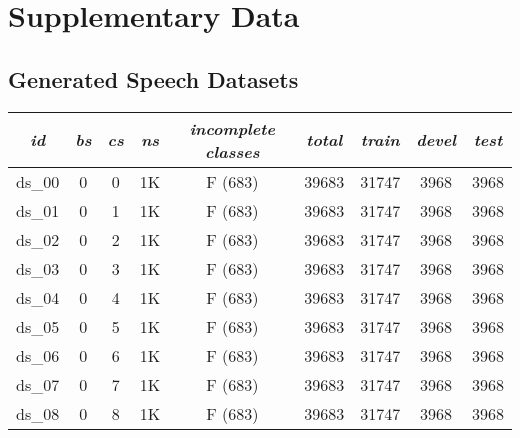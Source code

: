 \chapter{Supplementary Data} \label{app:supplementary_data}

\section*{Generated Speech Datasets} \label{app:sec:generated_speech_datasets}

\begin{footnotesize}
\begin{longtable}{|c|c|c|c|c|c|c|c|c|}
\hline
\textit{id} & \textit{bs} & \textit{cs} & \textit{ns} & \textit{incomplete classes} & \textit{total} & \textit{train} & \textit{devel} & \textit{test} \\ \hline
\endhead
ds\_00      & 0           & 0           & 1K        & F (683)                     & 39683         & 31747          & 3968           & 3968          \\ \hline
ds\_01      & 0           & 1           & 1K        & F (683)                     & 39683         & 31747          & 3968           & 3968          \\ \hline
ds\_02      & 0           & 2           & 1K        & F (683)                     & 39683         & 31747          & 3968           & 3968          \\ \hline
ds\_03      & 0           & 3           & 1K        & F (683)                     & 39683         & 31747          & 3968           & 3968          \\ \hline
ds\_04      & 0           & 4           & 1K        & F (683)                     & 39683         & 31747          & 3968           & 3968          \\ \hline
ds\_05      & 0           & 5           & 1K        & F (683)                     & 39683         & 31747          & 3968           & 3968          \\ \hline
ds\_06      & 0           & 6           & 1K        & F (683)                     & 39683         & 31747          & 3968           & 3968          \\ \hline
ds\_07      & 0           & 7           & 1K        & F (683)                     & 39683         & 31747          & 3968           & 3968          \\ \hline
ds\_08      & 0           & 8           & 1K        & F (683)                     & 39683         & 31747          & 3968           & 3968          \\ \hline

\end{longtable}
\end{footnotesize}
